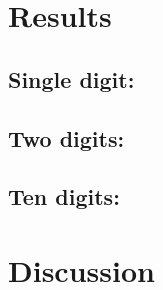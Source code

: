 \section{Results}

\subsection{Single digit:}

\subsection{Two digits:}

\subsection{Ten digits:}

\section{Discussion}

